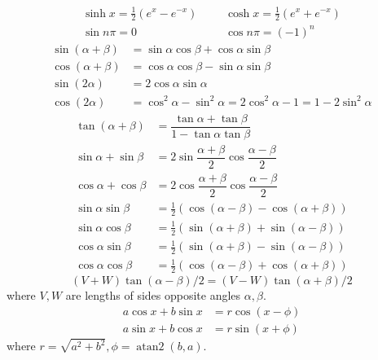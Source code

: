\begin{align*}
    \sinh x = \frac{1}{2}(e^x - e^{-x}) &&& \cosh x = \frac{1}{2}(e^x + e^{-x}) \\
    \sin n\pi = 0 &&& \cos n\pi = (-1)^n
\end{align*}
\begin{align*}
\sin(\alpha+\beta)&{}=\sin \alpha\cos \beta+\cos \alpha\sin \beta\\
\cos(\alpha+\beta)&{}=\cos \alpha\cos \beta-\sin \alpha\sin \beta\\
\sin(2\alpha) &{}=2\cos \alpha \sin \alpha \\
\cos(2\alpha) &{}=\cos^2 \alpha - \sin^2 \alpha =2\cos^2 \alpha - 1 =1 - 2 \sin^2 \alpha
\end{align*}
\begin{align*}
\tan(\alpha+\beta)&{}=\dfrac{\tan \alpha+\tan \beta}{1-\tan \alpha\tan \beta}\\
\sin \alpha+\sin \beta&{}=2\sin\dfrac{\alpha+\beta}{2}\cos\dfrac{\alpha-\beta}{2}\\
\cos \alpha+\cos \beta&{}=2\cos\dfrac{\alpha+\beta}{2}\cos\dfrac{\alpha-\beta}{2} \\
\sin \alpha \sin \beta&{}=\frac{1}{2}(\cos(\alpha - \beta) - \cos(\alpha + \beta)) \\
\sin \alpha \cos \beta&{}=\frac{1}{2}(\sin(\alpha + \beta) + \sin(\alpha - \beta)) \\
\cos \alpha \sin \beta&{}=\frac{1}{2}(\sin(\alpha + \beta) - \sin(\alpha - \beta)) \\
\cos \alpha \cos \beta&{}=\frac{1}{2}(\cos(\alpha - \beta) + \cos(\alpha + \beta))
\end{align*}
\[ (V+W)\tan(\alpha-\beta)/2{}=(V-W)\tan(\alpha+\beta)/2 \]
where $V, W$ are lengths of sides opposite angles $\alpha, \beta$.
\begin{align*}
	a\cos x+b\sin x&=r\cos(x-\phi)\\
	a\sin x+b\cos x&=r\sin(x+\phi)
\end{align*}
where $r=\sqrt{a^2+b^2}, \phi=\operatorname{atan2}(b,a)$.
